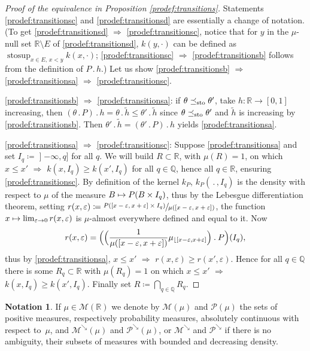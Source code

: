 \documentclass[11pt]{article}
\newcommand{\ldot}{\mathbin{.}}
\newcommand\mto{\mathchoice{\longmapsto}{\mapsto}{\mapsto}{\mapsto}}
\theoremstyle{plain}
\theoremstyle{definition}
\newtheorem{notation}[them]{Notation} %
\newcommand{\eqdef}{\coloneqq}
\let\eps\varepsilon
\newcommand{\p}{\mathcal{P}}
\newcommand{\m}{\mathcal{M}}
\newcommand{\R}{\mathbb{R}}
\newcommand{\Q}{\mathbb{Q}}
\newcommand{\stosup}{\operatorname{stosup}}
\newcommand{\leqs}{\preceq_{\text{\rm sto}}}
\newcommand{\pdec}{\mathcal{P}^{\scriptscriptstyle\searrow}}
\newcommand{\mdec}{\mathcal{M}^{\scriptscriptstyle\searrow}}
\newcommand{\op}{\mathopen}
\begin{document}
\begin{proof}[Proof of the equivalence in Proposition \ref{prodef:transitions}]
Statements \eqref{prodef:transitionsc} and \eqref{prodef:transitionsd} are essentially a change of notation. (To get \eqref{prodef:transitionsd} $\Rightarrow$ \eqref{prodef:transitionsc}, notice that for $y$ in the $\mu$-null set $\R\setminus E$ of \eqref{prodef:transitionsd}, $k(y,\cdot)$ can be defined as $\stosup_{x\in E,\,x<y} k(x,\cdot)$; \eqref{prodef:transitionsc} $\!\Rightarrow\!$ \eqref{prodef:transitionsb} follows from the definition of $P\ldot h$.) Let us show \eqref{prodef:transitionsb} $\Rightarrow$ \eqref{prodef:transitionsa} $\Rightarrow$ \eqref{prodef:transitionsc}.

\eqref{prodef:transitionsb} $\Rightarrow$ \eqref{prodef:transitionsa}: if $\theta\leqs \theta'$, take $h:\R\to[0,1]$ increasing, then $(\theta \ldot P)\ldot h= \theta \ldot\tilde h\leq \theta' \ldot\tilde h$ since $\theta\leqs \theta'$ and $\tilde h$ is increasing by \eqref{prodef:transitionsb}. Then $\theta'\ldot\tilde h=(\theta'\ldot P)\ldot h$ yields \eqref{prodef:transitionsa}.

\eqref{prodef:transitionsa} $\Rightarrow$ \eqref{prodef:transitionsc}: Suppose \eqref{prodef:transitionsa} and set $I_q\eqdef\op]-\infty,q]$ for all $q$. We will build $R\subset\R$, with $\mu(R)=1$, on which $x\leqslant x'$ $\Rightarrow$ $k(x,I_q)\geqslant k(x',I_q)$ for all $q\in\Q$, hence all $q\in\R$, ensuring \eqref{prodef:transitionsc}. By definition of the kernel $k_P$, $k_P(\,.\,,I_q)$ is the density with respect to $\mu$ of the measure $B\mto P(B\times I_q)$, thus by the Lebesgue differentiation theorem, setting $r(x,\eps)\eqdef\sfrac{P([x-\eps,x+\eps]\times I_q)}{\mu([x-\eps,x+\eps])}$, the function $x\mto\lim_{\eps\to0}r(x,\eps)$ is $\mu$-almost everywhere defined and equal to it. Now
\[
r(x,\eps)=\Bigl(\Bigl(\frac1{\mu([x-\eps,x+\eps])}\mu_{\lfloor[x-\eps,x+\eps]}\Bigr)\ldot P\Bigr)(I_q),
\]
thus by \eqref{prodef:transitionsa}, $x\leqslant x'$ $\Rightarrow$ $r(x,\eps)\geqslant r(x',\eps)$. Hence for all $q\in\Q$ there is some $R_q\subset \R$ with $\mu(R_q)=1$ on which $x\leqslant x'$ $\Rightarrow$ $k(x,I_q)\geqslant k(x',I_q)$. Finally set $R\eqdef\bigcap_{q\in\Q} R_q$.
\end{proof}

\begin{notation}\label{notation:mdec}
If $\mu\in\m(\R)$ we denote by $\m(\mu)$ and $\p(\mu)$ the sets of positive measures, respectively probability measures, absolutely continuous with respect to~$\mu$, and $\mdec(\mu)$ and $\pdec(\mu)$, or $\mdec$ and $\pdec$ if there is no ambiguity, their subsets of measures with bounded and decreasing density.
\end{notation}
\end{document}
